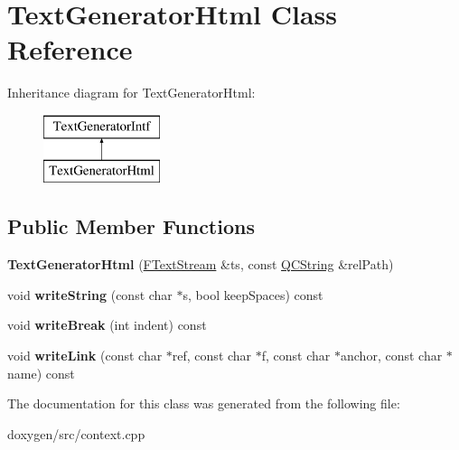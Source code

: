 \hypertarget{class_text_generator_html}{}\section{Text\+Generator\+Html Class Reference}
\label{class_text_generator_html}
Inheritance diagram for Text\+Generator\+Html\+:\begin{figure}[H]
\begin{center}
\leavevmode
\includegraphics[height=2.000000cm]{class_text_generator_html}
\end{center}
\end{figure}
\subsection*{Public Member Functions}
\begin{DoxyCompactItemize}
\item 
\mbox{\label{class_text_generator_html_a08feef8d9e69ce18b91df9d7ec404dda}} 
{\bfseries Text\+Generator\+Html} (\mbox{\hyperlink{class_f_text_stream}{F\+Text\+Stream}} \&ts, const \mbox{\hyperlink{class_q_c_string}{Q\+C\+String}} \&rel\+Path)
\item 
\mbox{\label{class_text_generator_html_ac8359af8e033f5890bee8f0f74ef4aa2}} 
void {\bfseries write\+String} (const char $\ast$s, bool keep\+Spaces) const
\item 
\mbox{\label{class_text_generator_html_a23f3693a11031f5bcd339ddc8330863f}} 
void {\bfseries write\+Break} (int indent) const
\item 
\mbox{\label{class_text_generator_html_a68fdd5a119345840772dfccd2377881b}} 
void {\bfseries write\+Link} (const char $\ast$ref, const char $\ast$f, const char $\ast$anchor, const char $\ast$name) const
\end{DoxyCompactItemize}


The documentation for this class was generated from the following file\+:\begin{DoxyCompactItemize}
\item 
doxygen/src/context.\+cpp\end{DoxyCompactItemize}
